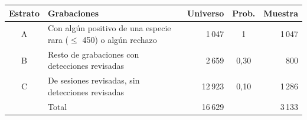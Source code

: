 \begin{tabular}{clrcr}
\toprule
Estrato & Grabaciones & Universo & Prob. & Muestra\\
\midrule
A & Con alg\'un positivo de una especie rara ($\leq$ 450) o alg\'un rechazo & 1\,047 & 1 & 1\,047\\
B & Resto de grabaciones con detecciones revisadas & 2\,659 & 0{,}30 & 800\\
C & De sesiones revisadas, sin detecciones revisadas & 12\,923 & 0{,}10 & 1\,286\\
\midrule
& Total & 16\,629 & & 3\,133\\
\bottomrule
\end{tabular}
